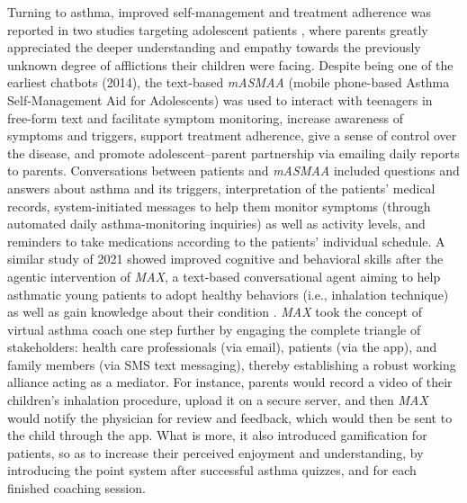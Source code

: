 Turning to asthma, improved self-management and treatment adherence was reported in two studies targeting adolescent patients \cite{asthma2014, max2021}, where parents greatly appreciated the deeper understanding and empathy towards the previously unknown degree of afflictions their children were facing. Despite being one of the earliest chatbots (2014), the text-based \textit{mASMAA} (mobile phone-based Asthma Self-Management Aid for Adolescents) was used to interact with teenagers in free-form text and facilitate symptom monitoring, increase awareness of symptoms and triggers, support treatment adherence, give a sense of control over the disease, and promote adolescent–parent partnership via emailing daily reports to parents. Conversations between patients and \textit{mASMAA} included questions and answers about asthma and its triggers, interpretation of the patients' medical records, system-initiated messages to help them monitor symptoms (through automated daily asthma-monitoring inquiries) as well as activity levels, and reminders to take medications according to the patients' individual schedule. A similar study of 2021 showed improved cognitive and behavioral skills after the agentic intervention of \textit{MAX}, a text-based conversational agent aiming to help asthmatic young patients to adopt healthy behaviors (i.e., inhalation technique) as well as gain knowledge about their condition \cite{max2021}. \textit{MAX} took the concept of virtual asthma coach one step further by engaging the complete triangle of stakeholders: health care professionals (via email), patients (via the app), and family members (via SMS text messaging), thereby establishing a robust working alliance acting as a mediator. For instance, parents would record a video of their children's inhalation procedure, upload it on a secure server, and then \textit{MAX} would notify the physician for review and feedback, which would then be sent to the child through the app. What is more, it also introduced gamification for patients, so as to increase their perceived enjoyment and understanding, by introducing the point system after successful asthma quizzes, and for each finished coaching session.

